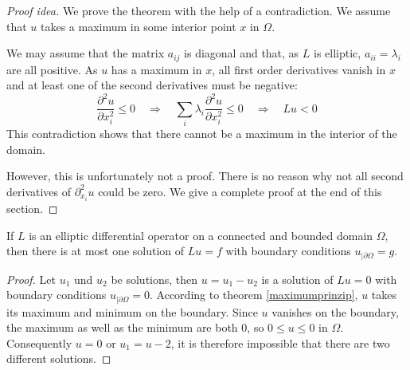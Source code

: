 \begin{proof}[Proof idea]
We prove the theorem with the help of a contradiction.
We assume that $u$ takes a maximum in some interior point $x$
in $\Omega$.

We may assume that the matrix $a_{ij}$ is diagonal and that, as $L$
is elliptic, $a_{ii}=\lambda_i$ are all positive.
As $u$ has a maximum in $x$, all first order derivatives vanish
in $x$ and at least one of the second derivatives
must be negative:
\[
\frac{\partial^2u}{\partial x_i^2}
\le 0
\quad
\Rightarrow
\quad
\sum_{i}\lambda_i \frac{\partial^2u}{\partial x_i^2} \le 0
\quad
\Rightarrow
\quad
Lu<0
\]
This contradiction shows that there cannot be a maximum in the
interior of the domain.

However, this is unfortunately not a proof.
There is no reason why not all second derivatives of $\partial^2_{x_i} u$ 
could be zero.
We give a complete proof at the end of this section.
\end{proof}

\begin{satz}
If $L$ is an elliptic differential operator on a connected and
bounded domain $\Omega$, then there is at most one solution of
$Lu=f$ 
with boundary conditions
$u_{|\partial\Omega}=g$.
\end{satz}

\begin{proof}
Let $u_1$ und $u_2$ be solutions, then $u=u_1-u_2$ is a solution of
$Lu=0$ with boundary conditions $u_{|\partial\Omega}=0$.
According to theorem \ref{maximumprinzip}, $u$ takes its maximum and
minimum on the boundary.
Since $u$ vanishes on the boundary, the maximum as well as the minimum
are both $0$, so $0\le u\le 0$ in $\Omega$.
Consequently $u=0$ or $u_1=u-2$, it is therefore impossible that
there are two different solutions.
\end{proof}

